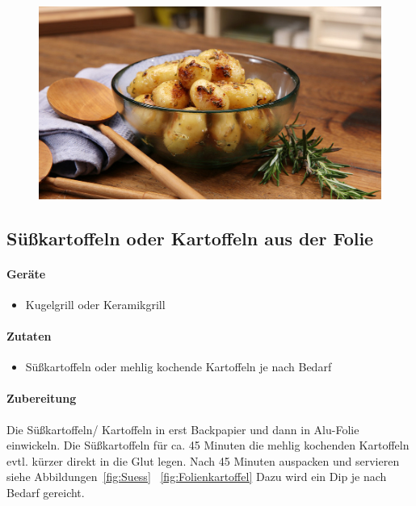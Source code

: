 \begin{figure}[htbp]
	\centering
	\begin{minipage}{1\textwidth}
		\centering
		\includegraphics[width=.9\linewidth]{pics/Schwenkkartoffeln}
		\label{fig:Schwenkkartoffeln}
	\end{minipage}
\end{figure}
\newpage

\subsection{Süßkartoffeln oder Kartoffeln aus der Folie}

\paragraph{Geräte}

\begin{itemize}[noitemsep]
	\item Kugelgrill oder Keramikgrill
\end{itemize}

\paragraph{Zutaten}
	
\begin{itemize}[noitemsep]
	\item Süßkartoffeln oder mehlig kochende Kartoffeln je nach Bedarf
\end{itemize}

\paragraph{Zubereitung}

Die Süßkartoffeln/ Kartoffeln in erst Backpapier und dann in Alu-Folie 
einwickeln.
Die Süßkartoffeln für ca. 45 Minuten die mehlig kochenden Kartoffeln evtl. kürzer 
direkt in die Glut legen. Nach 45 Minuten auspacken und servieren siehe 
Abbildungen~\vref{fig:Suess} ~\vref{fig:Folienkartoffel} Dazu wird ein Dip je nach Bedarf 
gereicht.
\newpage

